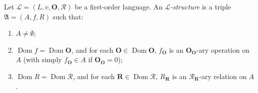 Let $\mathcal{L} = (L, v, \mathbf{O}, \mathcal{R})$ be a first-order language. An \textit{$\mathcal{L}$-structure} is a triple $\mathfrak{A} = (A, f, R)$ such that:
\begin{enumerate}
\item[(i)] $A \neq \emptyset$;
\item[(ii)] $\operatorname{Dom} f = \operatorname{Dom} \mathbf{O}$, and for each $\mathbf{O} \in \operatorname{Dom} \mathbf{O}$, $f_{\mathbf{O}}$ is an $\mathbf{O}_{\mathbf{O}}$-ary operation on $A$ (with simply $f_{\mathbf{O}} \in A$ if $\mathbf{O}_{\mathbf{O}} = 0$);
\item[(iii)] $\operatorname{Dom} R = \operatorname{Dom} \mathcal{R}$, and for each $\mathbf{R} \in \operatorname{Dom} \mathcal{R}$, $R_{\mathbf{R}}$ is an $\mathcal{R}_{\mathbf{R}}$-ary relation on $A$.
\end{enumerate}

